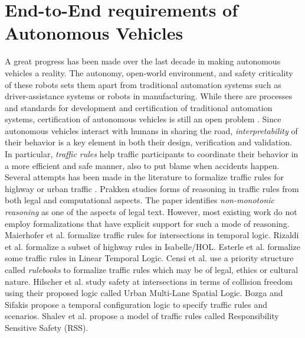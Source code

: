 \section{End-to-End requirements of Autonomous Vehicles}

A great progress has been made over the last decade in making autonomous vehicles a reality.
%
The autonomy, open-world environment, and safety criticality of these robots sets them apart from traditional automation systems such as driver-assistance systems or robots in manufacturing.
%
While there are processes and standards for development and certification of traditional automation systems, certification of autonomous vehicles is still an open problem \cite{Zhao.2022}.
%
Since autonomous vehicles interact with humans in sharing the road, \emph{interpretability} of their behavior is a key element in both their design, verification and validation.
%
In particular, \emph{traffic rules} help traffic participants to coordinate their behavior in a more efficient and safe manner, also to put blame when accidents happen.
%
Several attempts has been made in the literature to formalize traffic rules for highway or urban traffic \cite{Bin.2022,arechiga2019specifying,Corso.2020,Esterle.2020,Maierhofer.2020,Hekmatnejad.2019,Cho.2019,Sahin.2020,Censi.2019}.
%
Prakken \cite{Prakken.2017} studies forms of reasoning in traffic rules from both legal and computational aspects.
%
The paper identifies \emph{non-monotonic reasoning} as one of the aspects of legal text.
%
However, most existing work do not employ formalizations that have explicit support for such a mode of reasoning.
%
Maierhofer et al. \cite{Maierhofer.2022} formalize traffic rules for intersections in temporal logic.
%
Rizaldi et al. \cite{Rizaldi.2015,Rizaldi.2017} formalize a subset of highway rules in Isabelle/HOL.
%
Esterle et al. \cite{Esterle.2019,Esterle.2020} formalize some traffic rules in Linear Temporal Logic.
%
Censi et al. \cite{Censi.2019} use a priority structure called \emph{rulebooks} to formalize traffic rules which may be of legal, ethics or cultural nature.
%
Hilscher et al. \cite{Hilscher.2016} study safety at intersections in terms of collision freedom using their proposed logic called Urban Multi-Lane Spatial Logic.
%
Bozga and Sifakis \cite{Bozga.2021} propose a temporal configuration logic to specify traffic rules and scenarios.
%
Shalev et al. \cite{Shalev.2017} propose a model of traffic rules called Responsibility Sensitive Safety (RSS).



